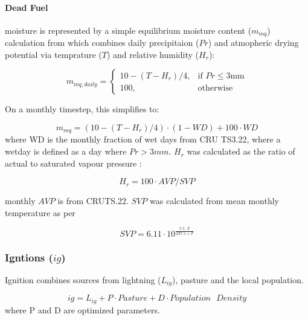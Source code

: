 \begin{shaded}
\paragraph{Dead Fuel} moisture is represented by a simple equilibrium moisture content ($m_{mq}$) calculation from \citep{viney1991review} which combines daily precipitaion ($Pr$) and atmopheric drying potential via temprature ($T$) and relative humidity ($H_r$):

\begin{equation}
     m_{mq, daily}=
        \begin{cases}
            10 - (T - H_r) / 4 ,& \text{if } Pr\leq 3 \text{mm}\\
            100,              & \text{otherwise}
        \end{cases}
\end{equation}

On a monthly timestep, this simplifies to:

\begin{equation}
     m_{mq}=
        (10 - (T - H_r) / 4) \cdot (1 - WD)
        + 100 \cdot WD
\end{equation}
where WD is the monthly fraction of wet days from CRU TS3.22, where a wetday is defined as a day where $Pr > 3mm$. $H_r$ was calculated as the ratio of actual to saturated vapour pressure :

\begin{equation}
    H_r = 100 \cdot AVP / SVP
\end{equation}

monthly $AVP$ is from CRUTS.22. $SVP$ was calculated from mean monthly temperature as per \citet{walter2000asce}

\begin{equation}
    SVP = 6.11 \cdot 10^{\frac{7.5 \cdot T}{237.5 + T}}
\end{equation}
\end{shaded}

\subsubsection{Igntions ($ig$)}

Ignition combines sources from lightning ($L_{ig}$), pasture and the local population.

\begin{equation}
    ig = L_{ig} + P \cdot Pasture + D \cdot Population\text{ }Density
\end{equation}
where P and D are optimized parameters.

